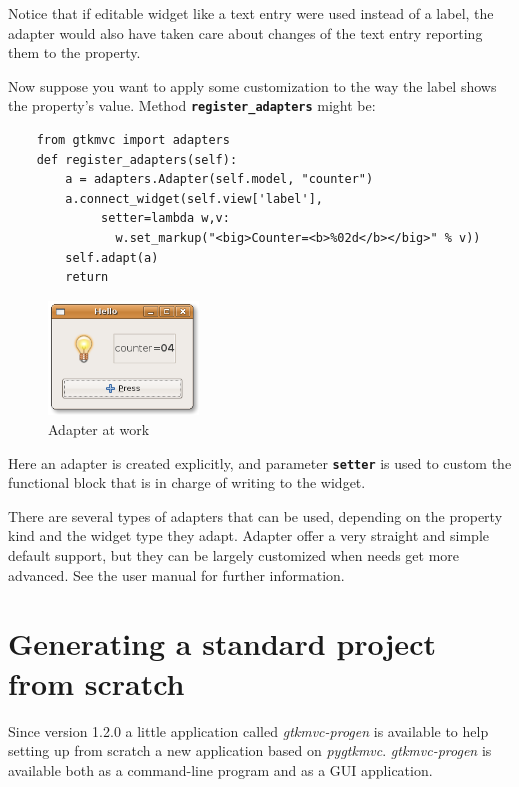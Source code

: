\documentclass{article}
\newcommand{\kw}[1]{\emph{#1}\xspace}
\newcommand{\pygtkmvc}{\kw{pygtkmvc}}
\newcommand{\codename}[1]{\texttt{\bfseries \textcolor {codecolor}{#1}}\xspace}
\newcommand{\codesize}{\small } %
\begin{document}
Notice that if editable widget like a text entry were used instead
of a label, the adapter would also have taken care about changes of
the text entry reporting them to the property. 

\bigskip
Now suppose you want to apply some customization to the way the
label shows the property's value. Method
\codename{register\_adapters} might be:

{ \codesize 
\begin{verbatim}   
    from gtkmvc import adapters
    def register_adapters(self):
        a = adapters.Adapter(self.model, "counter")
        a.connect_widget(self.view['label'], 
             setter=lambda w,v: 
               w.set_markup("<big>Counter=<b>%02d</b></big>" % v))
        self.adapt(a)
        return
\end{verbatim}
} 

\begin{figure}[htbp]
\begin{center}
\includegraphics[width=4cm]{eps/adap}
\caption{\label{fig:adap}Adapter at work}
\end{center}
\end{figure}

Here an adapter is created explicitly, and parameter
\codename{setter} is used to custom the functional block that is in
charge of writing to the widget.

There are several types of adapters that can be used, depending on
the property kind and the widget type they adapt. Adapter offer a
very straight and simple default support, but they can be largely
customized when needs get more advanced. See the user manual for
further information.


\section{Generating a standard project from scratch}

Since version 1.2.0 a little application called \kw{gtkmvc-progen}
is available to help setting up from scratch a new application based
on \pygtkmvc. \kw{gtkmvc-progen} is available both as a command-line
program and as a GUI application. 
\end{document}

